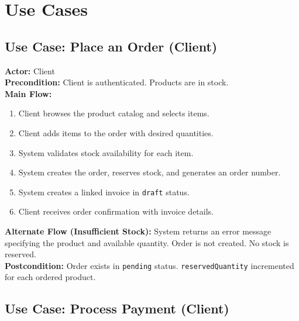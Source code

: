 ﻿\documentclass[12pt,a4paper]{report}
\begin{document}
\section{Use Cases}

\subsection{Use Case: Place an Order (Client)}

\begin{tcolorbox}[reqbox,title={UC-01: Place Order}]
\textbf{Actor:} Client \\
\textbf{Precondition:} Client is authenticated. Products are in stock. \\
\textbf{Main Flow:}
\begin{enumerate}[leftmargin=1.5em]
  \item Client browses the product catalog and selects items.
  \item Client adds items to the order with desired quantities.
  \item System validates stock availability for each item.
  \item System creates the order, reserves stock, and generates an order number.
  \item System creates a linked invoice in \texttt{draft} status.
  \item Client receives order confirmation with invoice details.
\end{enumerate}
\textbf{Alternate Flow (Insufficient Stock):} System returns an error message specifying the product and available quantity. Order is not created. No stock is reserved. \\
\textbf{Postcondition:} Order exists in \texttt{pending} status. \texttt{reservedQuantity} incremented for each ordered product.
\end{tcolorbox}

\subsection{Use Case: Process Payment (Client)}
\end{document}
